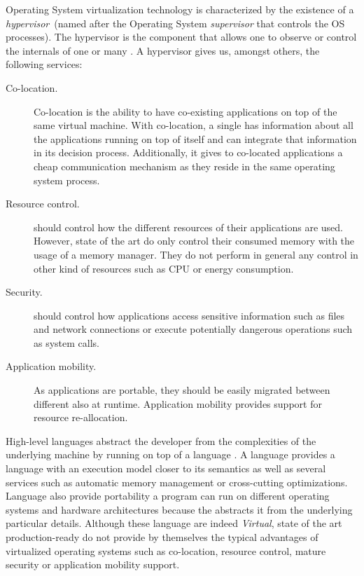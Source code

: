 Operating System virtualization technology is characterized by the existence of a \emph{hypervisor}~(named after the Operating System \emph{supervisor} that controls the OS processes). The hypervisor is the \VM component that allows one to observe or control the internals of one or many \VMs. A \VM hypervisor gives us, amongst others, the following services:

\begin{description}
\item[Co-location.] Co-location is the ability to have co-existing applications on top of the same virtual machine. With co-location, a single \VM has information about all the applications running on top of itself and can integrate that information in its decision process. Additionally, it gives to co-located applications a cheap communication mechanism as they reside in the same operating system process.
\item[Resource control.] \VMs should control how the different resources of their applications are used. However, state of the art \VMs do only control their consumed memory with the usage of a memory manager. They do not perform in general any control in other kind of resources such as CPU or energy consumption.
\item[Security.] \VMs should control how applications access sensitive information such as files and network connections or execute potentially dangerous operations such as system calls.
\item[Application mobility.] As applications are portable, they should be easily migrated between different \VMs also at runtime. Application mobility provides support for resource re-allocation.
\end{description}

High-level languages abstract the developer from the complexities of the underlying machine by running on top of a language \VM. A language \VM provides a language with an execution model closer to its semantics as well as several services such as automatic memory management or cross-cutting optimizations. Language \VMs also provide portability \ie a program can run on different operating systems and hardware architectures because the \VM abstracts it from the underlying particular details. Although these language \VMs are indeed \emph{Virtual}, state of the art production-ready \VMs do not provide by themselves the typical advantages of virtualized operating systems such as co-location, resource control, mature security or application mobility support.

